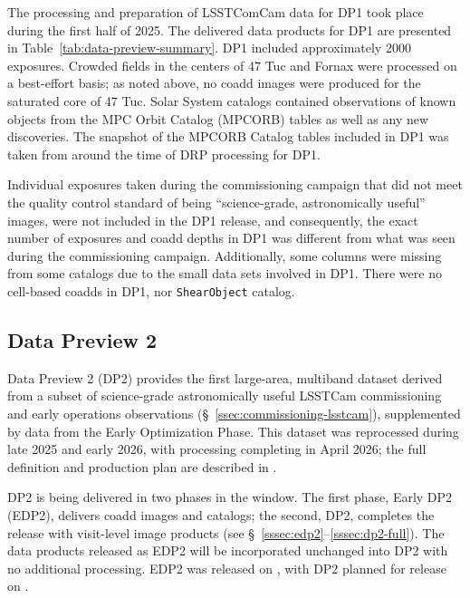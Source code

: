 The  processing and preparation of LSSTComCam data for DP1 took place during the first half of 2025.
The delivered data products for DP1 are presented in Table~\ref{tab:data-preview-summary}.
DP1 included approximately 2000 exposures.
Crowded fields in the centers of 47 Tuc and Fornax were processed on a best-effort basis; as noted above, no coadd images were produced for the saturated core of 47 Tuc.
Solar System catalogs contained observations of known objects from the MPC Orbit Catalog (MPCORB) tables as well as any new discoveries.
The snapshot of the MPCORB Catalog tables included in DP1 was taken from around the time of DRP processing for DP1.

Individual exposures taken during the commissioning campaign  that did not meet the quality control standard of being ``science-grade, astronomically useful'' images, were not included in the DP1 release,  and consequently, the exact number of exposures and coadd depths in DP1 was different from what was seen during the commissioning campaign.
Additionally, some columns were missing from some catalogs due to the small data sets involved in DP1.
There were  no cell-based coadds in DP1, nor \texttt{ShearObject} catalog.

\subsection{Data Preview 2}
\label{ssec:dp2}

Data Preview 2 (DP2) provides the first large-area, multiband dataset derived from a subset of science-grade astronomically useful LSSTCam commissioning and early operations observations (\S~\ref{ssec:commissioning-lsstcam}), supplemented by data from the Early Optimization Phase.
This dataset was reprocessed during late 2025 and early 2026, with processing completing in April 2026; the full definition and production plan are described in .

DP2 is being delivered in two phases in the \dptwofulldaterange window.
The first phase, Early DP2 (EDP2), delivers coadd images and catalogs; the second, DP2, completes the release with visit-level image products (see \S~\ref{sssec:edp2}--\ref{sssec:dp2-full}).
The data products released as EDP2 will be incorporated unchanged into DP2 with no additional processing.
EDP2 was released on \edptwodate, with DP2 planned for release on \dptwodate.

